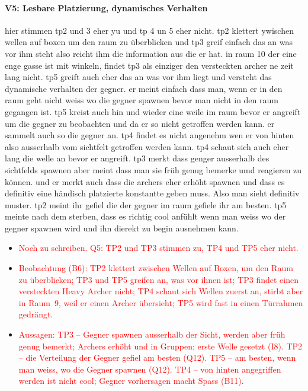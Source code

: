 \documentclass[../Main.tex]{subfiles}
\begin{document}
\paragraph{V5: Lesbare Platzierung, dynamisches Verhalten}
hier stimmen tp2 und 3 eher yu und tp 4 un 5 eher nicht. tp2 klettert ywischen wellen auf boxen um den raum zu überblicken und tp3 greif einfach das an was vor ihm steht also reicht ihm die information aus die er hat. in raum 10 der eine enge gasse ist mit winkeln, findet tp3 als einziger den versteckten archer ne zeit lang nicht. tp5 greift auch eher das an was vor ihm liegt und versteht das dynamische verhalten der gegner. er meint einfach dass man, wenn er in den raum geht nicht weiss wo die gegner spawnen bevor man nicht in den raum gegangen ist. tp5 kreist auch hin und wieder eine weile im raum bevor er angreift um die gegner zu beobachten und da er so nicht getroffen werden kann. er sammelt auch so die gegner an. tp4 findet es nicht angenehm wen er von hinten also ausserhalb vom sichtfelt getroffen werden kann. tp4 schaut sich auch eher lang die welle an bevor er angreift. tp3 merkt dass genger ausserhalb des sichtfelds spawnen aber meint dass man sie früh genug bemerke umd reagieren zu können. und er merkt auch dass die archers eher erhöht spawnen und dass es definitiv eine händisch platzierte konstantte geben muss. Also man sieht definitiv muster. tp2 meint ihr gefiel die der gegner im raum gefiele ihr am besten. tp5 meinte nach dem sterben, dass es richtig cool anfühlt wenn man weiss wo der gegner spawnen wird und ihn dierekt zu begin ausnehmen kann.
\begin{itemize}[leftmargin=1.5cm]
    \item \textcolor{red}{Noch zu schreiben. Q5: TP2 und TP3 stimmen zu, TP4 und TP5 eher nicht.}
    \item \textcolor{red}{Beobachtung (B6): TP2 klettert zwischen Wellen auf Boxen, um den Raum zu überblicken; TP3 und TP5 greifen an, was vor ihnen ist; TP3 findet einen versteckten Heavy Archer nicht; TP4 schaut sich Wellen zuerst an, stirbt aber in Raum~9, weil er einen Archer übersieht; TP5 wird fast in einen Türrahmen gedrängt.}
    \item \textcolor{red}{Aussagen: TP3 -- Gegner spawnen ausserhalb der Sicht, werden aber früh genug bemerkt; Archers erhöht und in Gruppen; erste Welle gesetzt (I8). TP2 -- die Verteilung der Gegner gefiel am besten (Q12). TP5 -- am besten, wenn man weiss, wo die Gegner spawnen (Q12). TP4 -- von hinten angegriffen werden ist nicht cool; Gegner vorhersagen macht Spass (B11).}
\end{itemize}
\end{document}
